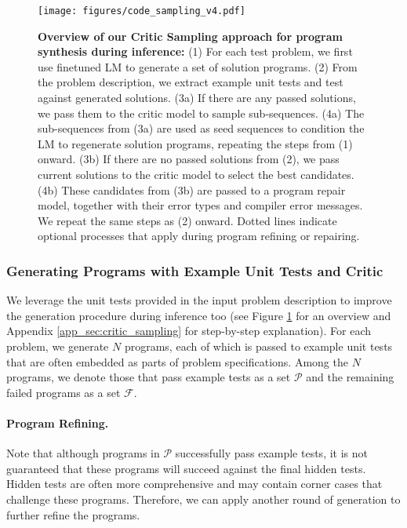 \documentclass{article}
\begin{document}
\begin{figure}[t]
	\centering
	\resizebox{1.0\textwidth}{!} {
\texttt{[image: figures/code\_sampling\_v4.pdf]}
	}
	\caption{
	\textbf{Overview of our Critic Sampling approach for program synthesis during inference:} 
	(1) For each test problem, we first use finetuned LM to generate a set of solution programs. 
	(2) From the problem description, we extract example unit tests and test against generated solutions. 
	(3a) If there are any passed solutions, we pass them to the critic model to sample sub-sequences. 
	(4a) The sub-sequences from (3a) are used as seed sequences to condition the LM to regenerate solution programs, repeating the steps from (1) onward.
	(3b) If there are no passed solutions from (2), we pass current solutions to the critic model to select the best candidates.
	(4b) These candidates from (3b) are passed to a program repair model, together with their error types and compiler error messages. 
	We repeat the same steps as (2) onward. 
Dotted lines indicate optional processes that apply during program refining or repairing.
	}
\label{fig:critic_sampling}
\end{figure}

\subsubsection{Generating Programs with Example Unit Tests and Critic}
We leverage the unit tests provided in the input problem description to improve the generation procedure during inference too (see Figure \ref{fig:critic_sampling} for an overview and Appendix \ref{app_sec:critic_sampling} for step-by-step explanation).
For each problem, we generate $N$ programs, each of which is passed to example unit tests that are often embedded as parts of problem specifications. 
Among the $N$ programs, we denote those that pass example tests as a set $\mathcal{P}$ and the remaining failed programs as a set $\mathcal{F}$.

\paragraph{Program Refining.}
Note that although programs in $\mathcal{P}$ successfully pass example tests, it is not guaranteed that these programs will succeed against the final hidden tests. 
Hidden tests are often more comprehensive and may contain corner cases that challenge these programs. 
Therefore, we can apply another round of generation to further refine the programs.
\end{document}
